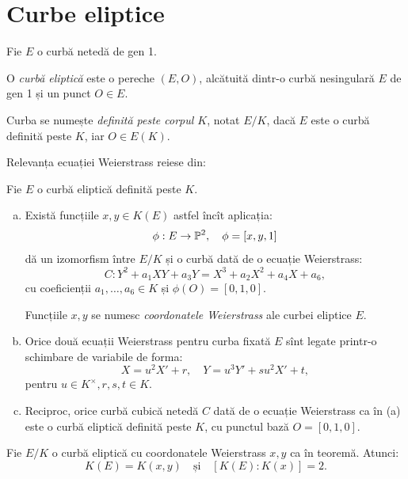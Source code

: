 \section{Curbe eliptice}

Fie $ E $ o curbă netedă de gen 1.

\begin{definition}\label{def:curba-el}
    O \emph{curbă eliptică} este o pereche $ (E, O) $, alcătuită dintr-o
    curbă nesingulară $ E $ de gen 1 și un punct $ O \in E $.

    Curba se numește \emph{definită peste corpul $ K $}, notat $ E/K $,
    dacă $ E $ este o curbă definită peste $ K $, iar $ O \in E(K) $.
\end{definition}

Relevanța ecuației Weierstrass reiese din:
\begin{proposition}\label{prop:weierstrass-eliptic}
    Fie $ E $ o curbă eliptică definită peste $ K $.
    \begin{enumerate}[(a)]
        \item Există funcțiile $ x, y \in K(E) $ astfel încît aplicația:
            \[
                \phi : E \to \mathbb{P}^2, \quad \phi = [x, y, 1]
            \]
           dă un izomorfism între $ E/K $ și o curbă dată de o ecuație Weierstrass:
           \[
               C : Y^2 + a_1 XY + a_3 Y = X^3 + a_2 X^2 + a_4 X + a_6,
           \]
           cu coeficienții $ a_1, \dots, a_6 \in K $ și $ \phi(O) = [0, 1, 0] $.

           Funcțiile $ x, y $ se numesc \emph{coordonatele Weierstrass} ale
           curbei eliptice $ E $.
       \item Orice două ecuații Weierstrass pentru curba fixată $ E $ sînt
           legate printr-o schimbare de variabile de forma:
           \[
                 X = u^2 X' + r, \quad Y = u^3 Y' + su^2 X' + t,
           \]
           pentru $ u \in K^\times, r, s, t \in K $.
       \item Reciproc, orice curbă cubică netedă $ C $ dată de o ecuație
           Weierstrass ca în (a) este o curbă eliptică definită peste $ K $,
           cu punctul bază $ O = [0, 1, 0] $.
    \end{enumerate}
\end{proposition}

\begin{corollary}\label{cor:weier-eliptic}
    Fie $ E/K $ o curbă eliptică cu coordonatele Weierstrass $ x, y $ ca în
    teoremă. Atunci:
    \[
        K(E) = K(x, y) \quad \text{și} \quad [K(E) : K(x)] = 2.
    \]
\end{corollary}




